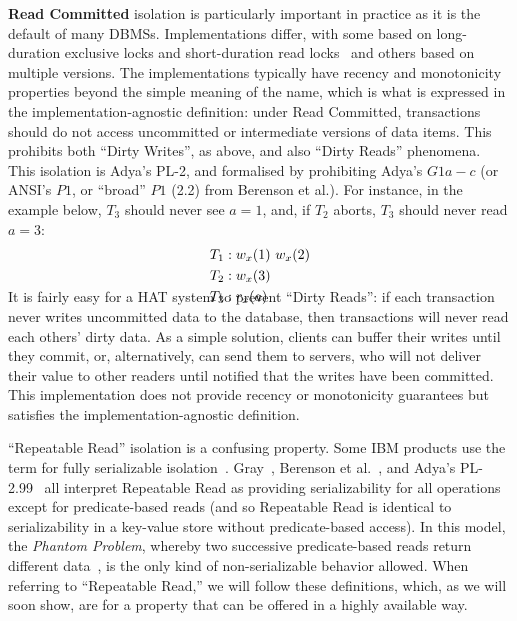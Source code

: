 \textbf{Read Committed} isolation is particularly important in
practice as it is the default of many DBMSs. Implementations differ,
with some based on long-duration exclusive locks and short-duration
read locks~\cite{gray-isolation} and others based on multiple
versions. The implementations typically have recency and monotonicity
properties beyond the simple meaning of the name, which is what is
expressed in the implementation-agnostic definition: under Read
Committed, transactions should do not access uncommitted or
intermediate versions of data items. This prohibits both ``Dirty
Writes'', as above, and also ``Dirty Reads'' phenomena.  This
isolation is Adya's PL-2, and formalised by prohibiting Adya's $G1a-c$
(or ANSI's $P1$, or ``broad'' $P1$ (2.2) from Berenson et al.). For
instance, in the example below, $T_3$ should never see $a=1$, and, if
$T_2$ aborts, $T_3$ should never read $a=3$:
\vspace{-.5em}
\begin{align*}
\small
T_1 &: w_x(1)~w_x(2)
\\T_2 &: w_x(3)\\
T_3 &: r_x(a)\\[-2em]
\end{align*}
It is fairly easy for a HAT system to prevent ``Dirty Reads'': if each
transaction never writes uncommitted data to the database, then
transactions will never read each others' dirty data. As a simple
solution, clients can buffer their writes until they commit, or,
alternatively, can send them to servers, who will not deliver their
value to other readers until notified that the writes have been
committed. This implementation does not provide recency or
monotonicity guarantees but satisfies the implementation-agnostic
definition.

``Repeatable Read'' isolation is a confusing property. Some IBM
products use the term for fully serializable
isolation~\cite{hat-hotos}. Gray~\cite{gray-isolation}, Berenson et
al.~\cite{ansicritique}, and Adya's PL-2.99~\cite{adya} all interpret
Repeatable Read as providing serializability for all operations except
for predicate-based reads (and so Repeatable Read is identical to
serializability in a key-value store without predicate-based
access). In this model, the \textit{Phantom Problem}, whereby two
successive predicate-based reads return different
data~\cite{gray-isolation}, is the only kind of non-serializable
behavior allowed. When referring to ``Repeatable Read,'' we will
follow these definitions, which, as we will soon show, are for a
property that can be offered in a highly available way.

